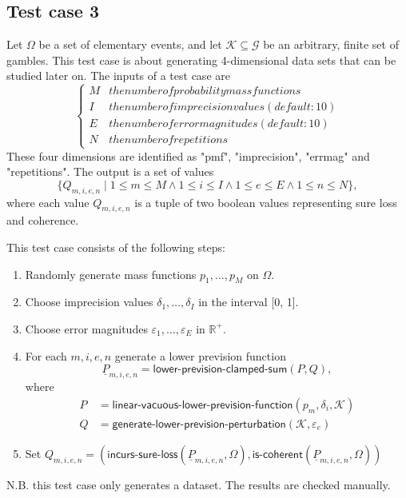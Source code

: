 \documentclass{article}
\theoremstyle{mytheorem}
\newcommand{\func}[1]{\ensuremath{\textsf{#1}}} %
\newcommand{\set}[1]{\ensuremath{\{ #1 \} }} %
\begin{document}
\clearpage
\subsection{Test case 3}
Let $\Omega$ be a set of elementary events, and let $\mathcal{K} \subseteq \mathcal{G}$ be an arbitrary, finite set of gambles.
This test case is about generating 4-dimensional data sets that can be studied later on.
The inputs of a test case are
\[
\begin{cases*}
    M & the number of probability mass functions \\
    I & the number of imprecision values (default: 10) \\
    E & the number of error magnitudes (default: 10) \\
    N & the number of repetitions
\end{cases*}
\]
These four dimensions are identified as "pmf", "imprecision", "errmag" and "repetitions".
The output is a set of values 
\[
\set{Q_{m,i,e,n} \mid 
  1 \leq m \leq M \land
  1 \leq i \leq I \land 
  1 \leq e \leq E \land
  1 \leq n \leq N
},
\]
where each value $Q_{m,i,e,n}$ is a tuple of two boolean values representing sure loss and coherence.

\vspace{0.5cm}
\noindent
This test case consists of the following steps:
\begin{enumerate}
    \item Randomly generate mass functions $p_1, \ldots, p_M$ on $\Omega$.
    \item Choose imprecision values $\delta_1, \ldots, \delta_I$ in the interval [0, 1].
    \item Choose error magnitudes $\varepsilon_1, \ldots, \varepsilon_E$ in $\mathbb{R}^{+}$.
    \item For each $m,i,e,n$ generate a lower prevision function
    \[
      \underline{P}_{m,i,e,n} = \func{lower-prevision-clamped-sum}(P, Q),
    \]
    where
    \begin{align*}
      P &= \func{linear-vacuous-lower-prevision-function}(p_m,\delta_i,\mathcal{K}) \\
      Q &= \func{generate-lower-prevision-perturbation}(\mathcal{K},\varepsilon_e)
    \end{align*}
    \item Set $Q_{m,i,e,n} = (
      \func{incurs-sure-loss}(\underline{P}_{m,i,e,n}, \Omega),
      \func{is-coherent}(\underline{P}_{m,i,e,n}, \Omega)
    )$
\end{enumerate}
N.B. this test case only generates a dataset. The results are checked manually.
\end{document}
